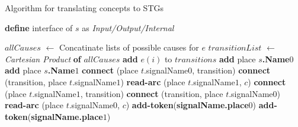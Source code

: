 \documentclass[british, journal]{IEEEtran}
\begin{document}
\begin{algorithm}[t]
\begin{algorithmic}
\caption{Algorithm for translating concepts to STGs\label{alg:translation}}
  \State \textbf{define} interface of $s$ as \emph{Input/Output/Internal}
\EndFor

  \State $allCauses$ $\leftarrow$ Concatinate lists of possible causes for $e$
  \State $transitionList$ $\leftarrow$ \emph{Cartesian Product} \textbf{of} $allCauses$
    \State \textbf{add} $e(i)$ to $transitions$
  \EndFor 
\EndFor
{}
  \State \textbf{add} place \textbf{$s$.Name}$0$
  \State \textbf{add} place \textbf{$s$.Name}$1$
\EndFor
{}
    \State \textbf{connect} (place $t$.signalName$0$, transition)
    \State \textbf{connect} (transition, place $t$.signalName$1$)
      \State \textbf{read-arc} (place $t$.signalName$1$, $c$)
    \EndFor
  \EndIf
    \State \textbf{connect} (place $t$.signalName$1$, transition)
    \State \textbf{connect} (transition, place $t$.signalName$0$)
      \State \textbf{read-arc} (place $t$.signalName$0$, $c$)
    \EndFor
  \EndIf
\EndFor
{}
    \State \textbf{add-token}(\textbf{signalName.place}$0$)
  \EndIf 
    \State \textbf{add-token}(\textbf{signalName.place}$1$)
  \EndIf
\EndFor

\end{algorithmic}
\end{algorithm}

%
%
%
\end{document}
